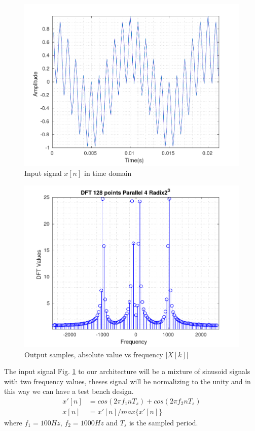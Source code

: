 \documentclass[journal,comsoc]{IEEEtran}
\begin{document}
\begin{figure} 
	\centering
	\includegraphics[width=0.92\linewidth]{Diagramas/DftInputSignal.pdf}
	\caption{Input signal $x[n]$ in time domain}
	\label{fig:dftinputsignal}
\end{figure}

\begin{figure} 
	\centering
	\includegraphics[width=0.95\linewidth]{Diagramas/DftFixedPoint.pdf}
	\caption{Output samples, absolute value vs frequency $|X[k]|$}
	\label{fig:dftfixedpoint}
\end{figure}
The input signal Fig. \ref{fig:dftinputsignal} to our architecture will be a mixture of sinusoid signals with two frequency values, theses signal will be normalizing to the unity and in this way we can have a test bench design.
\begin{align}\label{eq: inputSignal}
x'[n] &= cos(2\pi f_1 n T_s) + cos(2\pi f_2 n T_s)  \\
x[n] &= x'[n]/max\{x'[n]\} 						\nonumber
\end{align}
where $f_1=100Hz$, $f_2=1000Hz$ and $T_s$ is the sampled period.
\end{document}
